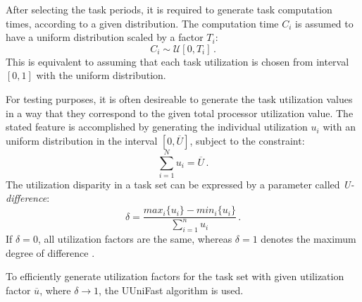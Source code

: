 After selecting the task periods, it is required to generate task computation times, according to a given distribution.
The computation time $C_i$ is assumed to have a uniform distribution scaled by a factor $T_i$:
\begin{equation*}
C_i \sim \mathcal{U}[0, T_i] \, .
\end{equation*}
This is equivalent to assuming that each task utilization is chosen from interval $[0, 1]$ with the uniform distribution.

For testing purposes, it is often desireable to generate the task utilization values in a way that they correspond to the given total processor utilization value.
The stated feature is accomplished by generating the individual utilization $u_i$ with an uniform distribution in the interval $[0, \overline{U}]$, subject to the constraint:
\begin{equation*}
\sum_{i=1}^{N}u_i = \overline{U} \, .
\end{equation*}
The utilization disparity in a task set can be expressed by a parameter called \textit{U-difference}:
\begin{equation*}
\delta = \frac{max_i\{u_i\}-min_i\{u_i\}}{\sum_{i=1}^{n}u_i} \, .
\end{equation*}
If $\delta = 0$, all utilization factors are the same, whereas $\delta=1$ denotes the maximum degree of difference \cite{bini2005measuring}.

To efficiently generate utilization factors for the task set with given utilization factor $\overline{u}$, where $\delta \rightarrow 1$, the UUniFast algorithm is used.

